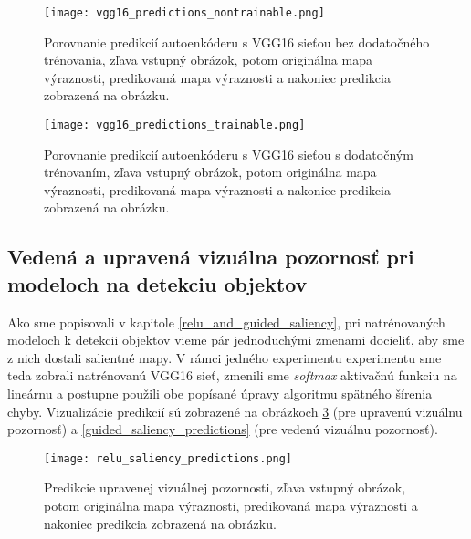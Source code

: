 

\begin{figure}[H]
	\begin{center}
		\texttt{[image: vgg16\_predictions\_nontrainable.png]}
		\caption[Porovnanie predikcií autoenkóderu s VGG16 sieťou bez dodatočného trénovania voči reálnym mapám výraznosti]{
			Porovnanie predikcií autoenkóderu s VGG16 sieťou bez dodatočného trénovania, zľava vstupný obrázok, potom originálna mapa výraznosti, predikovaná mapa výraznosti a nakoniec predikcia zobrazená na obrázku.
		}\label{vgg16_predictions_nontrainable}
	\end{center}
\end{figure}

\begin{figure}[H]
	\begin{center}
		\texttt{[image: vgg16\_predictions\_trainable.png]}
		\caption[Porovnanie predikcií autoenkóderu s VGG16 sieťou s dodatočným trénovaním voči reálnym mapám výraznosti]{
			Porovnanie predikcií autoenkóderu s VGG16 sieťou s dodatočným trénovaním, zľava vstupný obrázok, potom originálna mapa výraznosti, predikovaná mapa výraznosti a nakoniec predikcia zobrazená na obrázku.
		}\label{vgg_predictions_trainable}
	\end{center}
\end{figure}

\subsection{Vedená a upravená vizuálna pozornosť pri modeloch na detekciu objektov}

Ako sme popisovali v kapitole \ref{relu_and_guided_saliency}, pri natrénovaných modeloch k detekcii objektov vieme pár jednoduchými zmenami docieliť, aby sme z nich dostali salientné mapy. V rámci jedného experimentu experimentu sme teda zobrali natrénovanú VGG16 sieť, zmenili sme \textit{softmax} aktivačnú funkciu na lineárnu a postupne použili obe popísané úpravy algoritmu spätného šírenia chyby. Vizualizácie predikcií sú zobrazené na obrázkoch \ref{relu_saliency_predictions} (pre upravenú vizuálnu pozornosť) a \ref{guided_saliency_predictions} (pre vedenú vizuálnu pozornosť). 

\begin{figure}[H]
	\begin{center}
		\texttt{[image: relu\_saliency\_predictions.png]}
		\caption[Porovnanie predikcií upravenej vizuálnej pozornosti voči reálnym mapám výraznosti]{
			Predikcie upravenej vizuálnej pozornosti, zľava vstupný obrázok, potom originálna mapa výraznosti, predikovaná mapa výraznosti a nakoniec predikcia zobrazená na obrázku.
		}\label{relu_saliency_predictions}
	\end{center}
\end{figure}

